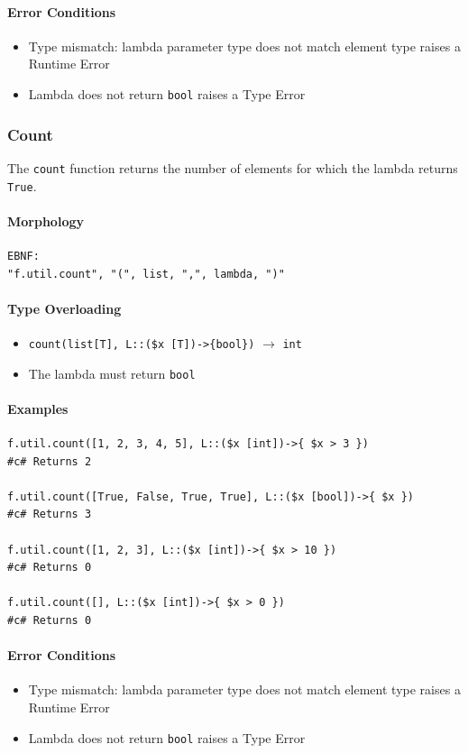 \paragraph{Error Conditions}
\begin{itemize}
\item Type mismatch: lambda parameter type does not match element type raises a Runtime Error
\item Lambda does not return \texttt{bool} raises a Type Error
\end{itemize}

\subsubsection{Count}
The \texttt{count} function returns the number of elements for which the lambda returns \texttt{True}.

\paragraph{Morphology}
\begin{verbatim}
EBNF:
"f.util.count", "(", list, ",", lambda, ")"
\end{verbatim}

\paragraph{Type Overloading}
\begin{itemize}
\item \texttt{count(list[T], L::(\$x [T])->\{bool\})} $\rightarrow$ \texttt{int}
\item The lambda must return \texttt{bool}
\end{itemize}

\paragraph{Examples}
\begin{verbatim}
f.util.count([1, 2, 3, 4, 5], L::($x [int])->{ $x > 3 })
#c# Returns 2

f.util.count([True, False, True, True], L::($x [bool])->{ $x })
#c# Returns 3

f.util.count([1, 2, 3], L::($x [int])->{ $x > 10 })
#c# Returns 0

f.util.count([], L::($x [int])->{ $x > 0 })
#c# Returns 0
\end{verbatim}

\paragraph{Error Conditions}
\begin{itemize}
\item Type mismatch: lambda parameter type does not match element type raises a Runtime Error
\item Lambda does not return \texttt{bool} raises a Type Error
\end{itemize}

